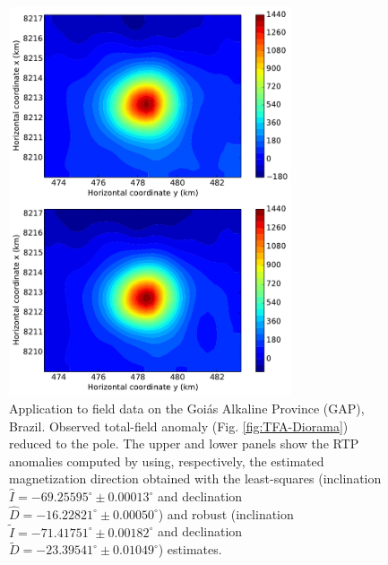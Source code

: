 \documentclass[journal abbreviation, npg]{copernicus}
\begin{document}
\begin{figure}[t]
\vspace*{2mm}
\begin{center}
\includegraphics[width=8.3cm]{Figures/TFA_Diorama_RTP.pdf}
\end{center}
\caption{Application to field data on the Goiás Alkaline Province (GAP), Brazil. Observed total-field anomaly (Fig. \ref{fig:TFA-Diorama}) reduced to the pole. The upper and lower panels show the RTP anomalies computed by using, respectively, the estimated magnetization direction obtained with the least-squares (inclination $\hat{I} = -69.25595^{\circ} \pm 0.00013^{\circ}$ and declination $\hat{D} = -16.22821^{\circ} \pm 0.00050^{\circ}$) and robust (inclination $\tilde{I} = -71.41751^{\circ} \pm 0.00182^{\circ}$ and declination $\tilde{D} = -23.39541^{\circ} \pm 0.01049^{\circ}$) estimates.}
\label{fig:TFA-Diorama-RTP}
\end{figure}
\end{document}
